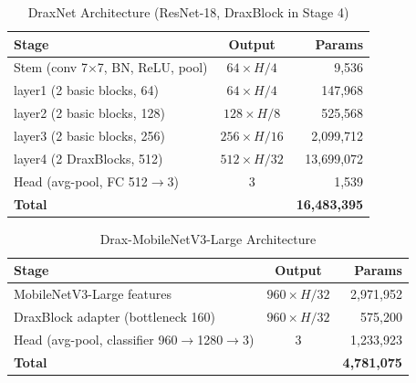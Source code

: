 \documentclass[conference, letterpaper]{IEEEtran}
\begin{document}
\begin{table}[!ht]
\renewcommand{\arraystretch}{1.2}
\centering
\begin{threeparttable}
\caption{DraxNet Architecture (ResNet-18, DraxBlock in Stage 4)}
\label{tab:arch_draxnet}
\footnotesize
\begin{tabular}{@{}l c r@{}}
\toprule
\textbf{Stage} & \textbf{Output} & \textbf{Params} \\
\midrule
Stem (conv 7$\times$7, BN, ReLU, pool) & $64\times H/4$ & 9,536 \\
layer1 (2 basic blocks, 64) & $64\times H/4$ & 147,968 \\
layer2 (2 basic blocks, 128) & $128\times H/8$ & 525,568 \\
layer3 (2 basic blocks, 256) & $256\times H/16$ & 2,099,712 \\
layer4 (2 DraxBlocks, 512) & $512\times H/32$ & 13,699,072 \\
Head (avg-pool, FC 512$\to$3) & 3 & 1,539 \\
\midrule
\textbf{Total} & & \textbf{16,483,395} \\
\bottomrule
\end{tabular}
\end{threeparttable}
\end{table}

\begin{table}[!ht]
\renewcommand{\arraystretch}{1.2}
\centering
\begin{threeparttable}
\caption{Drax-MobileNetV3-Large Architecture}
\label{tab:arch_draxmobilenet}
\footnotesize
\begin{tabular}{@{}l c r@{}}
\toprule
\textbf{Stage} & \textbf{Output} & \textbf{Params} \\
\midrule
MobileNetV3-Large features & $960\times H/32$ & 2,971,952 \\
DraxBlock adapter (bottleneck 160) & $960\times H/32$ & 575,200 \\
Head (avg-pool, classifier 960$\to$1280$\to$3) & 3 & 1,233,923 \\
\midrule
\textbf{Total} & & \textbf{4,781,075} \\
\bottomrule
\end{tabular}
\end{threeparttable}
\end{table}
\end{document}
